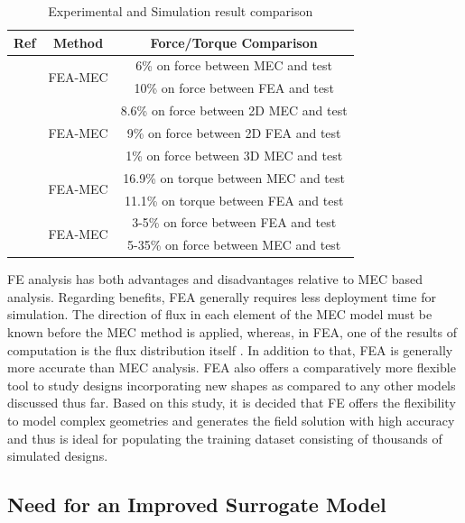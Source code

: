 \begin{table}[H]
\centering
\begin{tabular}{||c|c|c||}
\hline
\hline
\textbf{Ref} & \textbf{Method} & \textbf{Force/Torque Comparison}\\
\hline
\hline
\multirow{2}{*}{\parencite{liu2006closed}} & \multirow{2}{*}{FEA-MEC} & 6\% on force between MEC and test \\
 & & 10\% on force between FEA and test \\
\hline
\multirow{3}{*}{\parencite{hur1997analysis}} & \multirow{3}{*}{FEA-MEC} & 8.6\% on force between 2D MEC and test \\
& & 9\% on force between 2D FEA and test\\
& & 1\% on force between 3D MEC and test\\
\hline
\multirow{2}{*}{\parencite{leplat1996comparison}} & \multirow{2}{*}{FEA-MEC} & 16.9\% on torque between MEC and test\\
& & 11.1\% on torque between FEA and test\\
\hline
\multirow{2}{*}{\parencite{kim2004static}} & \multirow{2}{*}{FEA-MEC} & 3-5\% on force between FEA and test\\
& & 5-35\% on force between MEC and test\\
\hline
\end{tabular}
\caption{Experimental and Simulation result comparison}
\label{table:2}
\end{table}

FE analysis has both advantages and disadvantages relative to MEC based analysis. Regarding benefits, FEA generally requires less deployment time for simulation. The direction of flux in each element of the MEC model must be known before the MEC method is applied, whereas, in FEA, one of the results of computation is the flux distribution itself \parencite{ostovic2012dynamics}. In addition to that, FEA is generally more accurate than MEC analysis. FEA also offers a comparatively more flexible tool to study designs incorporating new shapes as compared to any other models discussed thus far. Based on this study, it is decided that FE offers the flexibility to model complex geometries and generates the field solution with high accuracy and thus is ideal for populating the training dataset consisting of thousands of simulated designs.

\subsection{Need for an Improved Surrogate Model}

